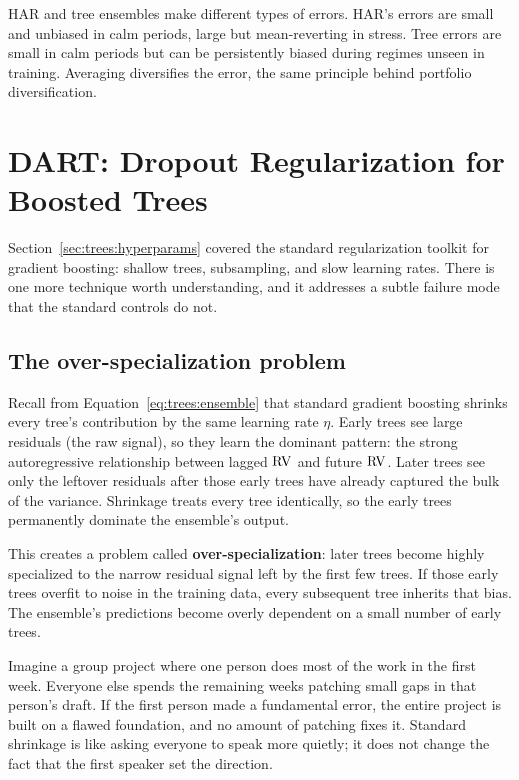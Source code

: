 \begin{intuition}
HAR and tree ensembles make different types of errors.  HAR's errors are
small and unbiased in calm periods, large but mean-reverting in stress.
Tree errors are small in calm periods but can be persistently biased during
regimes unseen in training.  Averaging diversifies the error, the same
principle behind portfolio diversification.
\end{intuition}


\section{DART: Dropout Regularization for Boosted Trees}\label{sec:trees:dart}

Section~\ref{sec:trees:hyperparams} covered the standard regularization
toolkit for gradient boosting: shallow trees, subsampling, and slow learning
rates.  There is one more technique worth understanding, and it addresses a
subtle failure mode that the standard controls do not.

\subsection*{The over-specialization problem}

Recall from Equation~\ref{eq:trees:ensemble} that standard gradient boosting
shrinks every tree's contribution by the same learning rate $\eta$.  Early
trees see large residuals (the raw signal), so they learn the dominant
pattern: the strong autoregressive relationship between lagged $\operatorname{RV}$ and
future $\operatorname{RV}$.  Later trees see only the leftover residuals after those early
trees have already captured the bulk of the variance.  Shrinkage treats every
tree identically, so the early trees permanently dominate the ensemble's
output.

This creates a problem called \textbf{over-specialization}: later trees
become highly specialized to the narrow residual signal left by the first
few trees.  If those early trees overfit to noise in the training data, every
subsequent tree inherits that bias.  The ensemble's predictions become overly
dependent on a small number of early trees.

\begin{intuition}
Imagine a group project where one person does most of the work in the first
week.  Everyone else spends the remaining weeks patching small gaps in that
person's draft.  If the first person made a fundamental error, the entire
project is built on a flawed foundation, and no amount of patching fixes it.
Standard shrinkage is like asking everyone to speak more quietly; it does not
change the fact that the first speaker set the direction.
\end{intuition}

